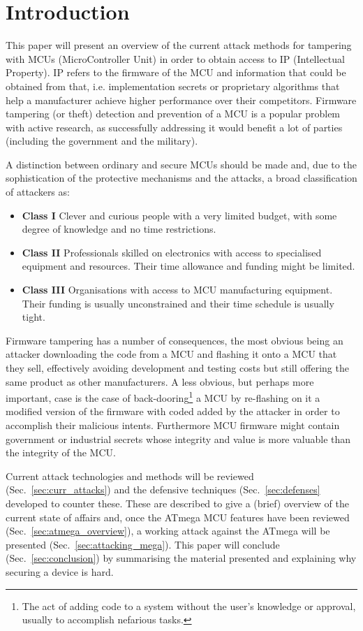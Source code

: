 \section{Introduction}
	This paper will present an overview of the current attack methods for tampering with MCUs (MicroController Unit) in order to obtain access to IP (Intellectual Property). IP refers to the firmware of the MCU and information that could be obtained from that, i.e. implementation secrets or proprietary algorithms that help a manufacturer achieve higher performance over their competitors. Firmware tampering (or theft) detection and prevention of a MCU is a popular problem with active research, as successfully addressing it would benefit a lot of parties (including the government and the military).
	
	A distinction between ordinary and secure MCUs should be made\citep{sergei:thesis} and, due to the sophistication of the protective mechanisms and the attacks, a broad classification of attackers as\cite{anderson:cautionary_note}:
		\begin{itemize}
			\item \textbf{Class I} Clever and curious people with a very limited budget, with some degree of knowledge and no time restrictions.\\
			\item \textbf{Class II} Professionals skilled on electronics with access to specialised equipment and resources. Their time allowance and funding might be limited.\\
			\item \textbf{Class III} Organisations with access to MCU manufacturing equipment. Their funding is usually unconstrained and their time schedule is usually tight.
		\end{itemize}
	
	Firmware tampering has a number of consequences, the most obvious being an attacker downloading the code from a MCU and flashing it onto a MCU that they sell, effectively avoiding development and testing costs but still offering the same product as other manufacturers\cite{tech:aes_bls}. A less obvious, but perhaps more important, case is the case of back-dooring\footnote{The act of adding code to a system without the user's knowledge or approval, usually to accomplish nefarious tasks.} a MCU by re-flashing on it a modified version of the firmware with coded added by the attacker in order to accomplish their malicious intents. Furthermore MCU firmware might contain government or industrial secrets whose integrity and value is more valuable than the integrity of the MCU.
	
	Current attack technologies and methods will be reviewed (Sec.~\ref{sec:curr_attacks}) and the defensive techniques (Sec.~\ref{sec:defenses} developed to counter these. These are described to give a (brief) overview of the current state of affairs and, once the ATmega MCU features have been reviewed (Sec.~\ref{sec:atmega_overview}), a working attack against the ATmega will be presented (Sec.~\ref{sec:attacking_mega}). This paper will conclude (Sec.~\ref{sec:conclusion}) by summarising the material presented and explaining why securing a device is hard. 
